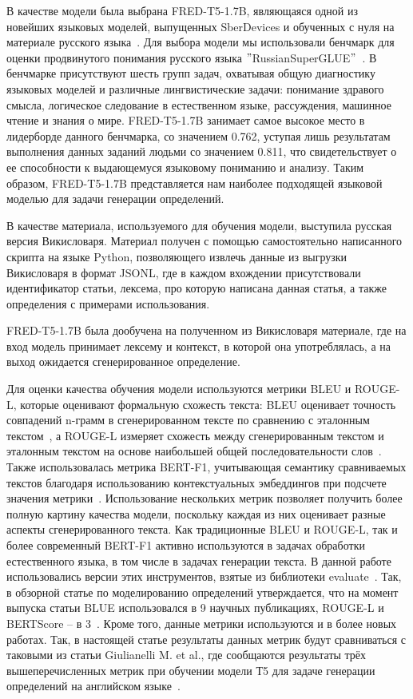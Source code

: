 \documentclass[LI,VKR]{HSEUniversity}
\begin{document}
В качестве модели была выбрана FRED-T5-1.7B, являющаяся одной из новейших языковых моделей,
выпущенных SberDevices и обученных с нуля на материале русского языка~\cite{FRED-T5}.
Для выбора модели мы использовали бенчмарк для оценки продвинутого понимания русского языка
\("\)RussianSuperGLUE\("\)~\cite{RussianSuperGLUE}. В бенчмарке присутствуют шесть групп задач, охватывая
общую диагностику языковых моделей и различные лингвистические задачи: понимание здравого смысла, логическое
следование в естественном языке, рассуждения, машинное чтение и знания о мире.
FRED-T5-1.7B занимает самое высокое место в лидерборде данного бенчмарка, со значением 0.762,
уступая лишь результатам выполнения данных заданий людьми со значением 0.811,
что свидетельствует о ее способности к выдающемуся языковому пониманию и анализу.
Таким образом, FRED-T5-1.7B представляется нам наиболее подходящей языковой моделью
для задачи генерации определений.

В качестве материала, используемого для обучения модели, выступила русская версия Викисловаря.
Материал получен с помощью самостоятельно написанного скрипта на языке Python, позволяющего
извлечь данные из выгрузки Викисловаря в формат JSONL, где в каждом вхождении присутствовали
идентификатор статьи, лексема, про которую написана данная статья, а также определения
с примерами использования.

FRED-T5-1.7B была дообучена на полученном из Викисловаря материале, где на вход модель
принимает лексему и контекст, в которой она употреблялась, а на выход ожидается сгенерированное
определение.

Для оценки качества обучения модели используются метрики BLEU и ROUGE-L,
которые оценивают формальную схожесть текста: BLEU оценивает точность совпадений n-грамм
в сгенерированном тексте по сравнению с эталонным текстом~\cite{BLUE}, а ROUGE-L измеряет схожесть между
сгенерированным текстом и эталонным текстом на основе наибольшей общей последовательности слов~\cite{ROUGE}.
Также использовалась метрика BERT-F1, учитывающая семантику сравниваемых текстов благодаря
использованию контекстуальных эмбеддингов при подсчете значения метрики~\cite{BERTScore}.
Использование нескольких метрик позволяет получить более полную картину качества модели,
поскольку каждая из них оценивает разные аспекты сгенерированного текста.
Как традиционные BLEU и ROUGE-L, так и более современный BERT-F1 активно используются в
задачах обработки естественного языка, в том числе в задачах генерации текста.
В данной работе использовались версии этих инструментов, взятые из библиотеки evaluate~\cite{Evaluate}.
Так, в обзорной статье по моделированию определений утверждается, что на момент выпуска статьи BLUE
использовался в 9 научных публикациях, ROUGE-L и BERTScore – в 3~\cite{DefinitionModelingReviewAndDatasetAnalysis}.
Кроме того, данные метрики используются и в более новых работах.
Так, в настоящей статье результаты данных метрик будут сравниваться с таковыми из статьи
Giulianelli M. et al., где сообщаются результаты трёх вышеперечисленных метрик при обучении модели
Т5 для задаче генерации определений на английском языке~\cite{DefinitionGenerationMainArticle}.

\printbibliography
\end{document}
